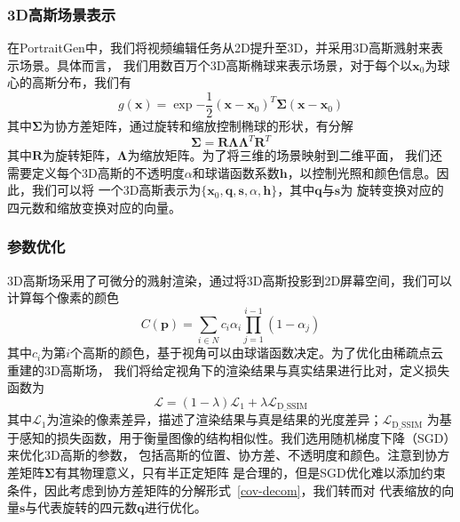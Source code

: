 \subsubsection{3D高斯场景表示}
在PortraitGen中，我们将视频编辑任务从2D提升至3D，并采用3D高斯溅射\cite{kerbl20233d}来表示场景。具体而言，
我们用数百万个3D高斯椭球来表示场景，对于每个以$\symbf{x}_0$为球心的高斯分布，我们有
\begin{equation}
    g(\symbf{x})=\exp{-\frac{1}{2}(\symbf{x}-\symbf{x}_0)^T\symbf{\Sigma}(\symbf{x}-\symbf{x}_0)}
\end{equation}
其中$\symbf{\Sigma}$为协方差矩阵，通过旋转和缩放控制椭球的形状，有分解
\begin{equation}
    \symbf{\Sigma}=\symbf{R}\symbf{\Lambda}\symbf{\Lambda}^T\symbf{R}^T
    \label{cov-decom}
\end{equation}
其中$\symbf{R}$为旋转矩阵，$\symbf{\Lambda}$为缩放矩阵。为了将三维的场景映射到二维平面，
我们还需要定义每个3D高斯的不透明度$\alpha$和球谐函数系数$\symbf{h}$，以控制光照和颜色信息。因此，我们可以将
一个3D高斯表示为$\{\symbf{x}_0,\symbf{q},\symbf{s},\alpha,\symbf{h} \}$，其中$\symbf{q}$与$\symbf{s}$为
旋转变换对应的四元数和缩放变换对应的向量。

\subsubsection{参数优化}
3D高斯场采用了可微分的溅射渲染，通过将3D高斯投影到2D屏幕空间，我们可以计算每个像素的颜色
\begin{equation}
    C(\symbf{p})=\sum_{i\in N}c_i\alpha_i\prod_{j=1}^{i-1}(1-\alpha_j)
\end{equation}
其中$c_i$为第$i$个高斯的颜色，基于视角可以由球谐函数决定。为了优化由稀疏点云重建的3D高斯场，
我们将给定视角下的渲染结果与真实结果进行比对，定义损失函数为
\begin{equation}
    \mathcal{L}=(1-\lambda)\mathcal{L}_1+\lambda\mathcal{L}_\text{D\_SSIM}
\end{equation}
其中$\mathcal{L}_1$为渲染的像素差异，描述了渲染结果与真是结果的光度差异；$\mathcal{L}_\text{D\_SSIM}$
为基于感知的损失函数，用于衡量图像的结构相似性。我们选用随机梯度下降（SGD）来优化3D高斯的参数，
包括高斯的位置、协方差、不透明度和颜色。注意到协方差矩阵$\symbf{\Sigma}$有其物理意义，只有半正定矩阵
是合理的，但是SGD优化难以添加约束条件，因此考虑到协方差矩阵的分解形式~\eqref{cov-decom}，我们转而对
代表缩放的向量$\symbf{s}$与代表旋转的四元数$\symbf{q}$进行优化。

